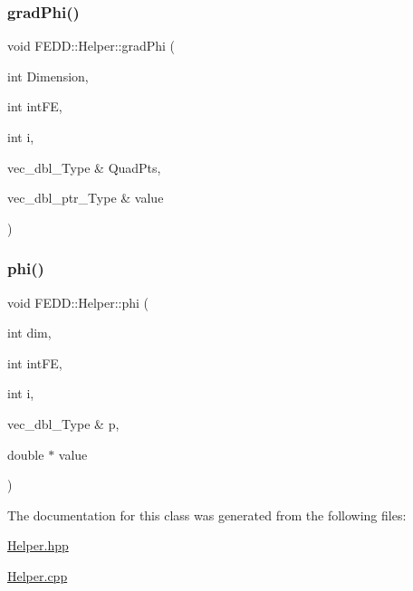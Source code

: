 \subsubsection{\texorpdfstring{grad\+Phi()}{gradPhi()}}
{\footnotesize\ttfamily void F\+E\+D\+D\+::\+Helper\+::grad\+Phi (\begin{DoxyParamCaption}\item[{int}]{Dimension,  }\item[{int}]{int\+FE,  }\item[{int}]{i,  }\item[{vec\+\_\+dbl\+\_\+\+Type \&}]{Quad\+Pts,  }\item[{vec\+\_\+dbl\+\_\+ptr\+\_\+\+Type \&}]{value }\end{DoxyParamCaption})\hspace{0.3cm}{\ttfamily [static]}}

\mbox{\label{classFEDD_1_1Helper_aca7380d78c4202232789905290c682a3}} 
\subsubsection{\texorpdfstring{phi()}{phi()}}
{\footnotesize\ttfamily void F\+E\+D\+D\+::\+Helper\+::phi (\begin{DoxyParamCaption}\item[{int}]{dim,  }\item[{int}]{int\+FE,  }\item[{int}]{i,  }\item[{vec\+\_\+dbl\+\_\+\+Type \&}]{p,  }\item[{double $\ast$}]{value }\end{DoxyParamCaption})\hspace{0.3cm}{\ttfamily [static]}}



The documentation for this class was generated from the following files\+:\begin{DoxyCompactItemize}
\item 
\hyperlink{Helper_8hpp}{Helper.\+hpp}\item 
\hyperlink{Helper_8cpp}{Helper.\+cpp}\end{DoxyCompactItemize}
